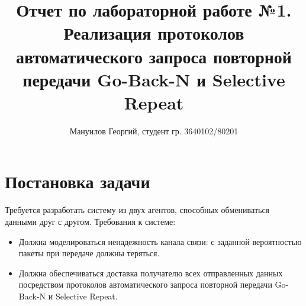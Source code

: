 \documentclass{report}
\title{
Отчет по лабораторной работе №1.\\
Реализация протоколов автоматического запроса повторной передачи Go-Back-N и Selective Repeat
}
\author{Мануилов Георгий, студент гр. 3640102/80201}
\date{}
\begin{document}
\maketitle

\renewcommand\thesection{\arabic{section}}

\section{Постановка задачи}
Требуется разработать систему из двух агентов, способных обмениваться данными друг с другом. Требования к системе:
\begin{itemize}
    \item Должна моделироваться ненадежность канала связи: с заданной вероятностью пакеты при передаче должны теряться.
    \item Должна обеспечиваться доставка получателю всех отправленных данных посредством протоколов автоматического запроса повторной передачи Go-Back-N и Selective Repeat.
\end{itemize}
\end{document}
